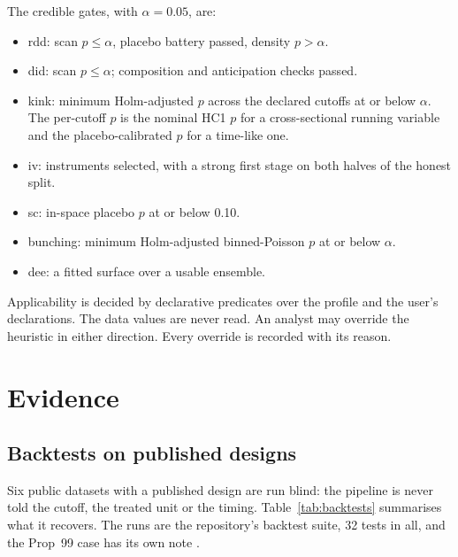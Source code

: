 \documentclass[11pt]{article}
\begin{document}
The credible gates, with $\alpha = 0.05$, are:
\begin{itemize}
\item rdd: scan $p \le \alpha$, placebo battery passed, density $p > \alpha$.
\item did: scan $p \le \alpha$; composition and anticipation checks passed.
\item kink: minimum Holm-adjusted $p$ across the declared cutoffs at or below $\alpha$.
The per-cutoff $p$ is the nominal HC1 $p$ for a cross-sectional running variable and
the placebo-calibrated $p$ for a time-like one.
\item iv: instruments selected, with a strong first stage on both halves of the honest
split.
\item sc: in-space placebo $p$ at or below 0.10.
\item bunching: minimum Holm-adjusted binned-Poisson $p$ at or below $\alpha$.
\item dee: a fitted surface over a usable ensemble.
\end{itemize}
Applicability is decided by declarative predicates over the profile and the user's
declarations. The data values are never read. An analyst may override the heuristic in
either direction. Every override is recorded with its reason.

\section{Evidence}\label{sec:evidence}

\subsection{Backtests on published designs}\label{sec:backtests}

Six public datasets with a published design are run blind: the pipeline is never told
the cutoff, the treated unit or the timing. Table~\ref{tab:backtests} summarises what it
recovers. The runs are the repository's backtest suite, 32 tests in all, and the Prop~99
case has its own note \cite{prop99note}.
\end{document}
